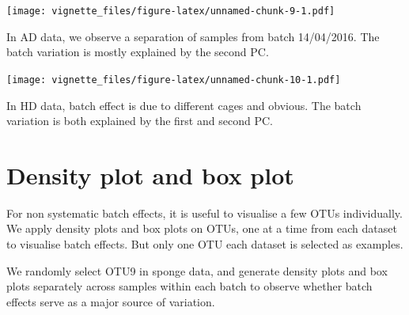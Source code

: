 \documentclass[]{book}
\newenvironment{Shaded}{\begin{snugshade}}{\end{snugshade}}
\newcommand{\KeywordTok}[1]{\textcolor[rgb]{0.13,0.29,0.53}{\textbf{#1}}}
\newcommand{\DataTypeTok}[1]{\textcolor[rgb]{0.13,0.29,0.53}{#1}}
\newcommand{\DecValTok}[1]{\textcolor[rgb]{0.00,0.00,0.81}{#1}}
\newcommand{\StringTok}[1]{\textcolor[rgb]{0.31,0.60,0.02}{#1}}
\newcommand{\CommentTok}[1]{\textcolor[rgb]{0.56,0.35,0.01}{\textit{#1}}}
\newcommand{\OperatorTok}[1]{\textcolor[rgb]{0.81,0.36,0.00}{\textbf{#1}}}
\newcommand{\NormalTok}[1]{#1}
\begin{document}
\texttt{[image: vignette\_files/figure-latex/unnamed-chunk-9-1.pdf]}

In AD data, we observe a separation of samples from batch 14/04/2016.
The batch variation is mostly explained by the second PC.

\begin{Shaded}
\end{Shaded}

\texttt{[image: vignette\_files/figure-latex/unnamed-chunk-10-1.pdf]}

In HD data, batch effect is due to different cages and obvious. The
batch variation is both explained by the first and second PC.

\section{Density plot and box plot}\label{density-plot-and-box-plot}

For non systematic batch effects, it is useful to visualise a few OTUs
individually. We apply density plots and box plots on OTUs, one at a
time from each dataset to visualise batch effects. But only one OTU each
dataset is selected as examples.

We randomly select OTU9 in sponge data, and generate density plots and
box plots separately across samples within each batch to observe whether
batch effects serve as a major source of variation.
\end{document}
